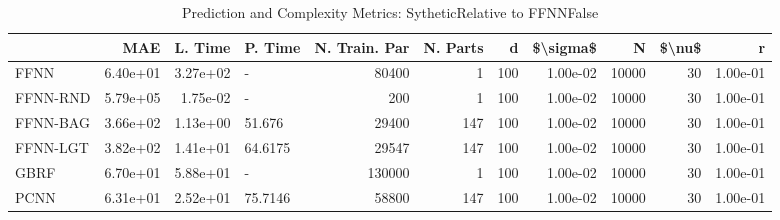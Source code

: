 \begin{table}
\centering
\caption{Prediction and Complexity Metrics: SytheticRelative to FFNNFalse}
\label{tab__Sythetic__Fix_Neurons_QTrue}
\begin{tabular}{lrrlrrrrrrr}
\toprule
{} &      MAE &  L. Time &  P. Time &  N. Train. Par &  N. Parts &    d &  \$\textbackslash sigma\$ &      N &  \$\textbackslash nu\$ &        r \\
\midrule
FFNN     & 6.40e+01 & 3.27e+02 &        - &          80400 &         1 &  100 &  1.00e-02 &  10000 &     30 & 1.00e-01 \\
FFNN-RND & 5.79e+05 & 1.75e-02 &        - &            200 &         1 &  100 &  1.00e-02 &  10000 &     30 & 1.00e-01 \\
FFNN-BAG & 3.66e+02 & 1.13e+00 &   51.676 &          29400 &       147 &  100 &  1.00e-02 &  10000 &     30 & 1.00e-01 \\
FFNN-LGT & 3.82e+02 & 1.41e+01 &  64.6175 &          29547 &       147 &  100 &  1.00e-02 &  10000 &     30 & 1.00e-01 \\
GBRF     & 6.70e+01 & 5.88e+01 &        - &         130000 &         1 &  100 &  1.00e-02 &  10000 &     30 & 1.00e-01 \\
PCNN     & 6.31e+01 & 2.52e+01 &  75.7146 &          58800 &       147 &  100 &  1.00e-02 &  10000 &     30 & 1.00e-01 \\
\bottomrule
\end{tabular}
\end{table}
